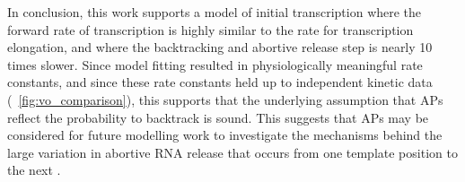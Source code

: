 In conclusion, this work supports a model of initial transcription where the
forward rate of transcription is highly similar to the rate for transcription
elongation, and where the backtracking and abortive release step is nearly 10
times slower. Since model fitting resulted in physiologically meaningful rate
constants, and since these rate constants held up to independent kinetic data
(\FIG~\ref{fig:vo_comparison}), this supports that the underlying assumption
that APs reflect the probability to backtrack is sound. This suggests that APs
may be considered for future modelling work to investigate the mechanisms
behind the large variation in abortive RNA release that occurs from one
template position to the next \cite{hsu_initial_2006}.
